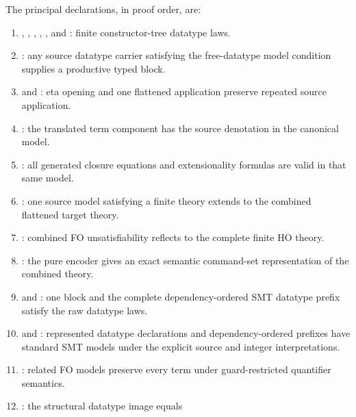 \documentclass[11pt]{article}
\theoremstyle{remark}
\begin{document}
\begin{sloppypar}
\small
The principal declarations, in proof order, are:
\begin{enumerate}[leftmargin=*]
 \item {}, ,
       , ,
       , and :
       finite constructor-tree datatype laws.
 \item {}: any source datatype carrier
       satisfying the free-datatype model condition supplies a productive typed block.
 \item {} and
       : eta opening and one
       flattened application preserve repeated source application.
 \item {}: the translated term component has
       the source denotation in the canonical model.
 \item {}: all generated closure equations and
       extensionality formulas are valid in that same model.
 \item {}: one source model satisfying a
       finite theory extends to the combined flattened target theory.
 \item {}: combined FO
       unsatisfiability reflects to the complete finite HO theory.
 \item {}: the pure encoder gives an exact semantic
       command-set representation of the combined theory.
 \item {} and
       : one block and the
       complete dependency-ordered SMT datatype prefix satisfy the raw datatype laws.
 \item {} and
       : represented
       datatype declarations and dependency-ordered prefixes have standard SMT
       models under the explicit source and integer interpretations.
 \item {}: related FO models preserve every
       term under guard-restricted quantifier semantics.
 \item {}: the structural datatype image equals

\end{enumerate}
\end{sloppypar}
\end{document}
